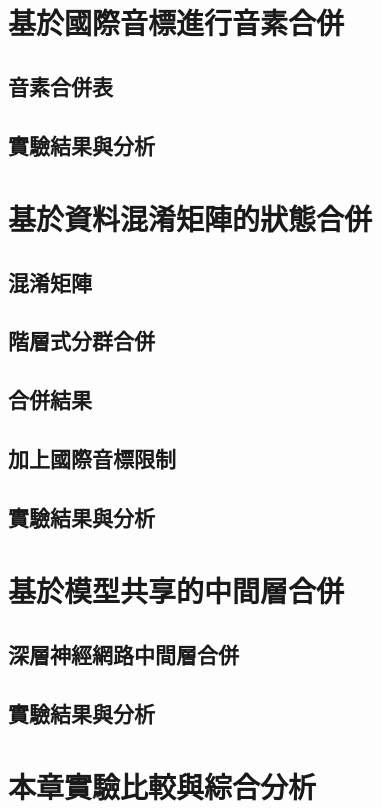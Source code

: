 \section{基於國際音標進行音素合併}
\subsection{音素合併表}
\subsection{實驗結果與分析}

\section{基於資料混淆矩陣的狀態合併}
\subsection{混淆矩陣}
\subsection{階層式分群合併}
\subsection{合併結果}
\subsection{加上國際音標限制}
\subsection{實驗結果與分析}

\section{基於模型共享的中間層合併}
\subsection{深層神經網路中間層合併}
\subsection{實驗結果與分析}

\section{本章實驗比較與綜合分析}
